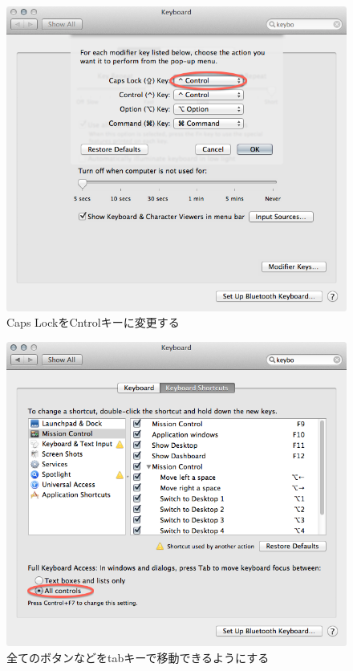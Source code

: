 \begin{figure}
  \begin{center}
    \includegraphics[scale=0.4,bb= 0 0 668 636]{fig/Keyboard1.png}
    \caption{Caps LockをCntrolキーに変更する}
    \label{fig_Keyboard1_png}
  \end{center}
\end{figure}

\begin{figure}
  \begin{center}
    \includegraphics[scale=0.4,bb= 0 0 668 636]{fig/Keyboard2.png}
    \caption{全てのボタンなどをtabキーで移動できるようにする}
    \label{fig_Keyboard2_png}
  \end{center}
\end{figure}

